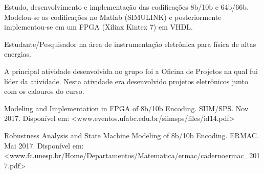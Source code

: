 \documentclass[10pt,a4paper,ragged2e]{altacv}
\begin{document}
Estudo, desenvolvimento e implementação das codificações 8b/10b e 64b/66b. Modelou-se as codificações no Matlab (SIMULINK) e posteriormente implementou-se em um FPGA (Xilinx Kintex 7) em VHDL. 

\divider

Estudante/Pesquisador na área de instrumentação eletrônica para física de altas energias. 

\divider

A principal atividade desenvolvida no grupo foi a Oficina de Projetos na qual fui líder da atividade. Nesta atividade era desenvolvido projetos eletrônicos junto com os calouros do curso. 


\medskip




\nocite{*}

\printbibliography[heading=pubtype,title={\printinfo{\faBook}{Books}},type=book]


\printbibliography[heading=pubtype,title={\printinfo{\faFileTextO}{Artigos}}, type=article]
Modeling and Implementation in FPGA of 8b/10b Encoding. SIIM/SPS. Nov 2017. Disponível em: <www.eventos.ufabc.edu.br/siimsps/files/id14.pdf>

\divider

Robustness Analysis and State Machine Modeling of 8b/10b Encoding. ERMAC. Mai 2017. Disponível em: <www.fc.unesp.br/Home/Departamentos/Matematica/ermac/caderno\-ermac\_2017.pdf>

\printbibliography[heading=pubtype,title={\printinfo{\faGroup}{Conference Proceedings}},type=inproceedings]

\end{document}
